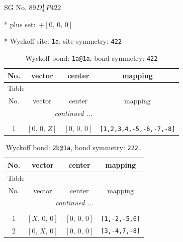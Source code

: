 \documentclass[fleqn,8pt]{jsarticle}
\begin{document}
\setcounter{MaxMatrixCols}{32}

\renewcommand{\tablename}{Table~}
\renewcommand{\figurename}{Figure~}
\begin{center}
\LARGE
SG No. 89\quad$D_{\rm 4}^{1}$\quad$P422$\quad[ tetragonal ]
\end{center}

* plus set:\,\,\,$+\left[ 0,\, 0,\, 0 \right]$


* Wyckoff site: {\tt 1a}, site symmetry: {\tt 422}
\renewcommand{\arraystretch}{1.2}
\begin{longtable}{cccc}
\caption{Wyckoff bond: {\tt 1a@1a}, bond symmetry: {\tt 422}}
 \\
 \hline \hline
No. & vector & center & mapping \\ \hline \endfirsthead

\multicolumn{3}{l}{\tablename\ \thetable{}} \\
 \hline \hline
No. & vector & center & mapping \\ \hline \endhead

 \hline \hline
\multicolumn{3}{r}{\footnotesize\it continued ...} \\ \endfoot

 \hline \hline
\multicolumn{3}{r}{} \\ \endlastfoot

1 & $\left[ 0,\, 0,\, Z \right]$ & $\left[ 0,\, 0,\, 0 \right]$ & {\tt [1,2,3,4,-5,-6,-7,-8]} \\
\end{longtable}
\renewcommand{\arraystretch}{1.2}
\begin{longtable}{cccc}
\caption{Wyckoff bond: {\tt 2b@1a}, bond symmetry: {\tt 222.}}
 \\
 \hline \hline
No. & vector & center & mapping \\ \hline \endfirsthead

\multicolumn{3}{l}{\tablename\ \thetable{}} \\
 \hline \hline
No. & vector & center & mapping \\ \hline \endhead

 \hline \hline
\multicolumn{3}{r}{\footnotesize\it continued ...} \\ \endfoot

 \hline \hline
\multicolumn{3}{r}{} \\ \endlastfoot

1 & $\left[ X,\, 0,\, 0 \right]$ & $\left[ 0,\, 0,\, 0 \right]$ & {\tt [1,-2,-5,6]} \\ \hline
2 & $\left[ 0,\, X,\, 0 \right]$ & $\left[ 0,\, 0,\, 0 \right]$ & {\tt [3,-4,7,-8]} \\
\end{longtable}
\end{document}
